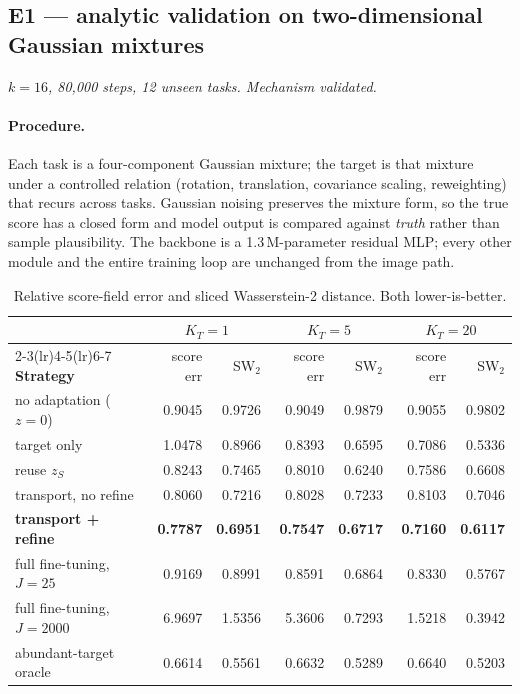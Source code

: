 \documentclass[11pt]{article}
\newcommand{\KT}{K_{T}}
\newcommand{\zS}{z_{S}}
\begin{document}
\subsection{E1 --- analytic validation on two-dimensional Gaussian mixtures}

\textit{$k=16$, 80{,}000 steps, 12 unseen tasks. Mechanism validated.}

\paragraph{Procedure.} Each task is a four-component Gaussian mixture; the target is that mixture
under a controlled relation (rotation, translation, covariance scaling, reweighting) that recurs
across tasks. Gaussian noising preserves the mixture form, so the true score has a closed form and
model output is compared against \emph{truth} rather than sample plausibility. The backbone is a
1.3\,M-parameter residual MLP; every other module and the entire training loop are unchanged from
the image path.

\begin{table}[htbp]
\centering\small
\begin{tabular}{@{}lrrrrrr@{}}
\toprule
& \multicolumn{2}{c}{$\KT=1$} & \multicolumn{2}{c}{$\KT=5$} & \multicolumn{2}{c}{$\KT=20$} \\
\cmidrule(lr){2-3}\cmidrule(lr){4-5}\cmidrule(lr){6-7}
\textbf{Strategy} & score err & SW$_2$ & score err & SW$_2$ & score err & SW$_2$ \\
\midrule
no adaptation ($z=0$)     & 0.9045 & 0.9726 & 0.9049 & 0.9879 & 0.9055 & 0.9802 \\
target only               & 1.0478 & 0.8966 & 0.8393 & 0.6595 & 0.7086 & 0.5336 \\
reuse $\zS$               & 0.8243 & 0.7465 & 0.8010 & 0.6240 & 0.7586 & 0.6608 \\
transport, no refine      & 0.8060 & 0.7216 & 0.8028 & 0.7233 & 0.8103 & 0.7046 \\
\textbf{transport + refine} & \textbf{0.7787} & \textbf{0.6951} & \textbf{0.7547} & \textbf{0.6717} & \textbf{0.7160} & \textbf{0.6117} \\
full fine-tuning, $J=25$  & 0.9169 & 0.8991 & 0.8591 & 0.6864 & 0.8330 & 0.5767 \\
full fine-tuning, $J=2000$& 6.9697 & 1.5356 & 5.3606 & 0.7293 & 1.5218 & 0.3942 \\
abundant-target oracle    & 0.6614 & 0.5561 & 0.6632 & 0.5289 & 0.6640 & 0.5203 \\
\bottomrule
\end{tabular}
\caption{Relative score-field error and sliced Wasserstein-2 distance. Both lower-is-better.}
\end{table}
\end{document}
